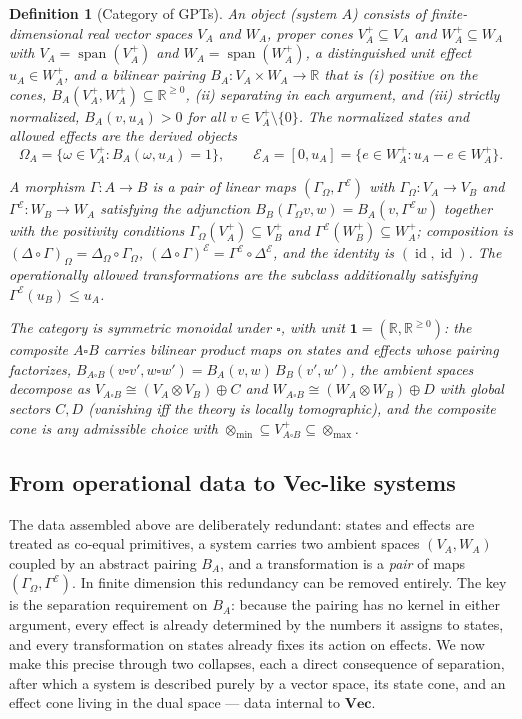 \documentclass[prl,aps,10pt,superscriptaddress, floatfix]{revtex4-2}
\newtheorem*{defi}{Definition}
\begin{document}
\begin{defi}[Category of GPTs]
An \emph{object} (system $A$) consists of finite-dimensional real vector spaces $V_A$ and $W_A$, proper cones $V_A^+\subseteq V_A$ and $W_A^+\subseteq W_A$ with $V_A=\operatorname{span}(V_A^+)$ and $W_A=\operatorname{span}(W_A^+)$, a distinguished unit effect $u_A\in W_A^+$, and a bilinear pairing $B_A:V_A\times W_A\to\mathbb{R}$ that is (i) positive on the cones, $B_A(V_A^+,W_A^+)\subseteq\mathbb{R}^{\ge0}$, (ii) separating in each argument, and (iii) strictly normalized, $B_A(v,u_A)>0$ for all $v\in V_A^+\setminus\{0\}$. The normalized states and allowed effects are the derived objects
\[
\Omega_A=\{\omega\in V_A^+:B_A(\omega,u_A)=1\},
\qquad
\mathcal E_A=[0,u_A]=\{e\in W_A^+: u_A-e\in W_A^+\}.
\]

A \emph{morphism} $\Gamma:A\to B$ is a pair of linear maps $(\Gamma_\Omega,\Gamma^{\mathcal E})$ with $\Gamma_\Omega:V_A\to V_B$ and $\Gamma^{\mathcal E}:W_B\to W_A$ satisfying the adjunction $B_B(\Gamma_\Omega v,w)=B_A(v,\Gamma^{\mathcal E}w)$ together with the positivity conditions $\Gamma_\Omega(V_A^+)\subseteq V_B^+$ and $\Gamma^{\mathcal E}(W_B^+)\subseteq W_A^+$; composition is $(\Delta\circ\Gamma)_\Omega=\Delta_\Omega\circ\Gamma_\Omega$, $(\Delta\circ\Gamma)^{\mathcal E}=\Gamma^{\mathcal E}\circ\Delta^{\mathcal E}$, and the identity is $(\operatorname{id},\operatorname{id})$. The \emph{operationally allowed} transformations are the subclass additionally satisfying $\Gamma^{\mathcal E}(u_B)\le u_A$.

The category is symmetric monoidal under $\square$, with unit $\mathbf 1=(\mathbb{R},\mathbb{R}^{\ge0})$: the composite $A\square B$ carries bilinear product maps on states and effects whose pairing factorizes, $B_{A\square B}(v\square v',w\square w')=B_A(v,w)\,B_B(v',w')$, the ambient spaces decompose as $V_{A\square B}\cong(V_A\otimes V_B)\oplus C$ and $W_{A\square B}\cong(W_A\otimes W_B)\oplus D$ with global sectors $C,D$ (vanishing iff the theory is locally tomographic), and the composite cone is any admissible choice with $\otimes_{\min}\subseteq V_{A\square B}^+\subseteq\otimes_{\max}$.
\end{defi}

\subsection{From operational data to Vec-like systems}

The data assembled above are deliberately redundant: states and effects are treated as co-equal primitives, a system carries two ambient spaces $(V_A,W_A)$ coupled by an abstract pairing $B_A$, and a transformation is a \emph{pair} of maps $(\Gamma_\Omega,\Gamma^{\mathcal E})$. In finite dimension this redundancy can be removed entirely. The key is the separation requirement on $B_A$: because the pairing has no kernel in either argument, every effect is already determined by the numbers it assigns to states, and every transformation on states already fixes its action on effects. We now make this precise through two collapses, each a direct consequence of separation, after which a system is described purely by a vector space, its state cone, and an effect cone living in the dual space --- data internal to $\mathbf{Vec}$.
\end{document}
